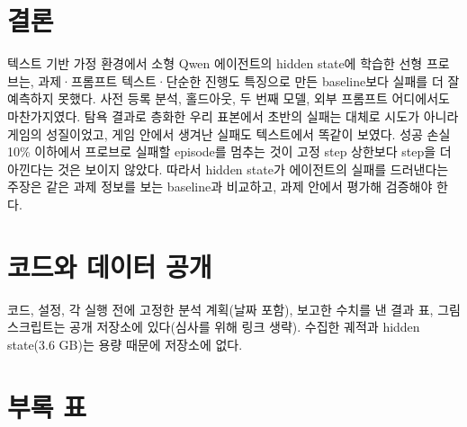 \documentclass[11pt]{article}
\begin{document}
\section{결론}
텍스트 기반 가정 환경에서 소형 Qwen 에이전트의 hidden state에 학습한 선형 프로브는, 과제·프롬프트 텍스트·단순한 진행도 특징으로 만든 baseline보다 실패를 더 잘 예측하지 못했다. 사전 등록 분석, 홀드아웃, 두 번째 모델, 외부 프롬프트 어디에서도 마찬가지였다.
탐욕 결과로 층화한 우리 표본에서 초반의 실패는 대체로 시도가 아니라 게임의 성질이었고, 게임 안에서 생겨난 실패도 텍스트에서 똑같이 보였다.
성공 손실 10\% 이하에서 프로브로 실패할 episode를 멈추는 것이 고정 step 상한보다 step을 더 아낀다는 것은 보이지 않았다.
따라서 hidden state가 에이전트의 실패를 드러낸다는 주장은 같은 과제 정보를 보는 baseline과 비교하고, 과제 안에서 평가해 검증해야 한다.

\section*{코드와 데이터 공개}
코드, 설정, 각 실행 전에 고정한 분석 계획(날짜 포함), 보고한 수치를 낸 결과 표, 그림 스크립트는 공개 저장소에 있다(심사를 위해 링크 생략). 수집한 궤적과 hidden state(3.6 GB)는 용량 때문에 저장소에 없다.




\appendix
\section{부록 표}
\setcounter{table}{0}
\renewcommand{\thetable}{A\arabic{table}}
\end{document}
